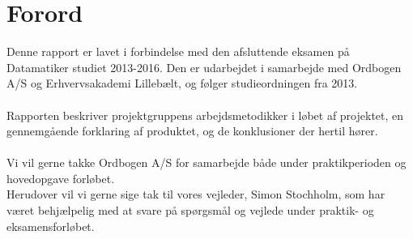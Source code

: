 \section{Forord}
Denne rapport er lavet i forbindelse med den afsluttende eksamen på Datamatiker studiet 2013-2016.
Den er udarbejdet i samarbejde med Ordbogen A/S og Erhvervsakademi Lillebælt, og følger studieordningen fra 2013.
\\\\
Rapporten beskriver projektgruppens arbejdsmetodikker i løbet af projektet, en gennemgående forklaring af produktet, og de konklusioner der hertil hører.
\\\\
Vi vil gerne takke Ordbogen A/S for samarbejde både under praktikperioden og hovedopgave forløbet.
\\
Herudover vil vi gerne sige tak til vores vejleder, Simon Stochholm, som har været behjælpelig med at svare på spørgsmål og vejlede under praktik- og eksamensforløbet.
